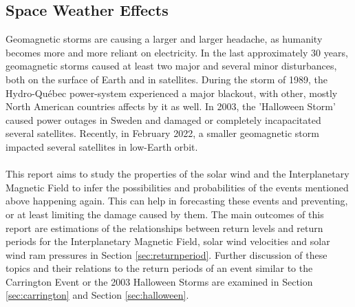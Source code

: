 \documentclass[12pt]{article}
\begin{document}
    \subsection{Space Weather Effects}\label{sec:spaceweather}
        Geomagnetic storms are causing a larger and larger headache, as humanity becomes more and more reliant on electricity. In the last approximately 30 years, geomagnetic storms caused at least two major and several minor disturbances, both on the surface of Earth and in satellites. During the storm of 1989, the Hydro-Québec power-system experienced a major blackout, with other, mostly North American countries affects by it as well\cite{1989hydroquebec}. In 2003, the 'Halloween Storm' \cite{2003halloweensweden} caused power outages in Sweden and damaged or completely incapacitated several satellites. Recently, in February 2022, a smaller geomagnetic storm impacted several satellites in low-Earth orbit\cite{2022spacex}.\\ \\
        This report aims to study the properties of the solar wind and the Interplanetary Magnetic Field to infer the possibilities and probabilities of the events mentioned above happening again. This can help in forecasting these events and preventing, or at least limiting the damage caused by them. The main outcomes of this report are estimations of the relationships between return levels and return periods for the Interplanetary Magnetic Field, solar wind velocities and solar wind ram pressures in Section \ref{sec:returnperiod}. Further discussion of these topics and their relations to the return periods of an event similar to the Carrington Event or the 2003 Halloween Storms are examined in Section \ref{sec:carrington} and Section \ref{sec:halloween}.
\end{document}

